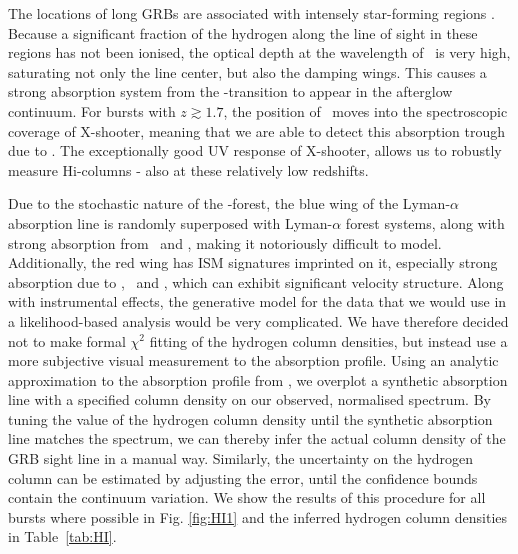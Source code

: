 \documentclass[longauth]{aa}    %
\begin{document}
The locations of long GRBs are associated with intensely star-forming regions
\citep{Hogg1999, Bloom2002, Fruchter2006, Lyman2017}. Because a significant fraction
of the hydrogen along the line of sight in these regions has not been ionised,
the optical depth at the wavelength of \lya~is very high, saturating not only
the line center, but also the damping wings. This causes a strong absorption
system from the \lya-transition to appear in the afterglow continuum. For bursts
with $z \gtrsim 1.7$, the position of \lya~moves into the spectroscopic coverage
of X-shooter, meaning that we are able to detect this absorption trough due to
\lya. The exceptionally good UV response of X-shooter, allows us to robustly
measure H{\sc i}-columns - also at these relatively low redshifts.

Due to the stochastic nature of the \lya-forest, the blue wing of the
Lyman-$\alpha$ absorption line is randomly superposed with Lyman-$\alpha$ forest
systems, along with strong absorption from \mnii~and \SIiii, making it
notoriously difficult to model. Additionally, the red wing has ISM signatures
imprinted on it, especially strong absorption due to \SIii, \sii~and \nv, which
can exhibit significant velocity structure. Along with instrumental effects, the
generative model for the data that we would use in a likelihood-based analysis
would be very complicated. We have therefore decided not to make formal $\chi^2$
fitting of the hydrogen column densities, but instead use a more subjective
visual measurement to the absorption profile. Using an analytic approximation to
the absorption profile from \citet{TepperGarcia2006}, we overplot a synthetic
absorption line with a specified column density on our observed, normalised
spectrum. By tuning the value of the hydrogen column density until the synthetic
absorption line matches the spectrum, we can thereby infer the actual column
density of the GRB sight line in a manual way. Similarly, the uncertainty on the
hydrogen column can be estimated by adjusting the error, until the confidence
bounds contain the continuum variation. We show the results of this procedure
for all bursts where possible in Fig. \ref{fig:HI1} and the inferred hydrogen
column densities in Table~\ref{tab:HI}.
\end{document}
